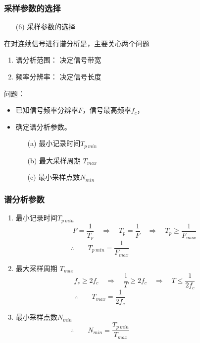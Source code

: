 \documentclass[notheorems,compress,mathserif,table]{beamer}
\begin{document}
\begin{frame}[shrink]\frametitle{采样参数的选择}%
  
\begin{enumerate}
	\item [(6)] 采样参数的选择
\end{enumerate}   
        在对连续信号进行谱分析是，主要关心两个问题
        \begin{enumerate}
          \item 谱分析范围： \qquad 决定信号带宽
          \item 频率分辨率： \qquad 决定信号长度
        \end{enumerate}

        问题：
        \begin{itemize}
          \item 已知信号频率分辨率$F$，信号最高频率$f_c$，
          \item 确定谱分析参数。
          \begin{enumerate}
          	\item  [(a)]最小记录时间$T_{p\: min}$
          	\item  [(b)]最大采样周期 $T_{max}$
          	\item  [(c)]最小采样点数$N_{min}$
        \end{enumerate}
        \end{itemize}
\end{frame}




\begin{frame}[shrink]\frametitle{谱分析参数}%
        \begin{enumerate}
          \item 最小记录时间$T_{p\: min}$
            $$F=\frac{1}{T_p} \quad \Longrightarrow\quad  T_p=\frac{1}{F}  \quad \Longrightarrow\quad   T_p\geq \frac{1}{F_{max}}$$
            $$\therefore\qquad T_{p\:min} = \frac{1}{F_{max}}\qquad\qquad\qquad\qquad\qquad$$
          \item 最大采样周期 $T_{max}$
            $$f_s \geq 2f_c \quad \Longrightarrow\quad \frac{1}{T} \geq 2f_c \quad\Longrightarrow\quad T\leq \frac{1}{2f_c} $$
            $$\therefore\qquad T_{max} = \frac{1}{2f_c}\qquad\qquad\qquad\qquad\qquad$$
          \item 最小采样点数$N_{min}$
            $$\therefore\qquad N_{min} = \frac{T_{p\: min}}{T_{max}}\qquad\qquad\qquad\qquad\qquad$$
        \end{enumerate}
\end{frame}
\end{document}
